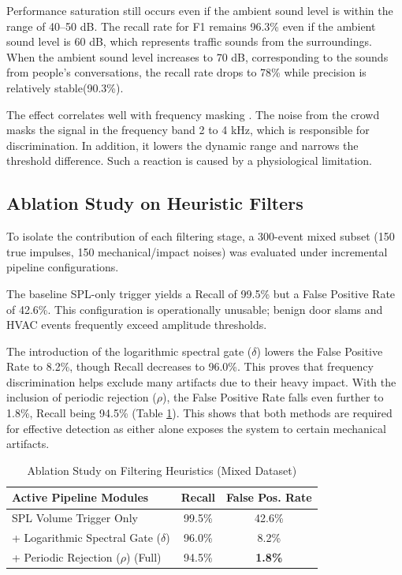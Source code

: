 \documentclass[conference]{IEEEtran}
\begin{document}
Performance saturation still occurs even if the ambient sound level is within the range of 40–50 dB. The recall rate for F1 remains 96.3\% even if the ambient sound level is 60 dB, which represents traffic sounds from the surroundings. When the ambient sound level increases to 70 dB, corresponding to the sounds from people’s conversations, the recall rate drops to 78\% while precision is relatively stable(90.3\%).

The effect correlates well with frequency masking \cite{b31}. The noise from the crowd masks the signal in the frequency band 2 to 4 kHz, which is responsible for discrimination. In addition, it lowers the dynamic range and narrows the threshold difference. Such a reaction is caused by a physiological limitation.

\subsection{Ablation Study on Heuristic Filters}
To isolate the contribution of each filtering stage, a 300-event mixed subset (150 true impulses, 150 mechanical/impact noises) was evaluated under incremental pipeline configurations.

The baseline SPL-only trigger yields a Recall of 99.5\% but a False Positive Rate of 42.6\%. This configuration is operationally unusable; benign door slams and HVAC events frequently exceed amplitude thresholds.

The introduction of the logarithmic spectral gate ($\delta$) lowers the False Positive Rate to 8.2\%, though Recall decreases to 96.0\%. This proves that frequency discrimination helps exclude many artifacts due to their heavy impact. With the inclusion of periodic rejection ($\rho$), the False Positive Rate falls even further to 1.8\%, Recall being 94.5\% (Table \ref{tab:ablation}). This shows that both methods are required for effective detection as either alone exposes the system to certain mechanical artifacts.

\begin{table}[htbp]
\caption{Ablation Study on Filtering Heuristics (Mixed Dataset)}
\begin{center}
\begin{tabular}{lcc}
\toprule
\textbf{Active Pipeline Modules} & \textbf{Recall} & \textbf{False Pos. Rate} \\
\midrule
SPL Volume Trigger Only & 99.5\% & 42.6\% \\
+ Logarithmic Spectral Gate ($\delta$) & 96.0\% & 8.2\% \\
+ Periodic Rejection ($\rho$) (Full) & 94.5\% & \textbf{1.8\%} \\
\bottomrule
\end{tabular}
\end{center}
\label{tab:ablation}
\end{table}
\end{document}
